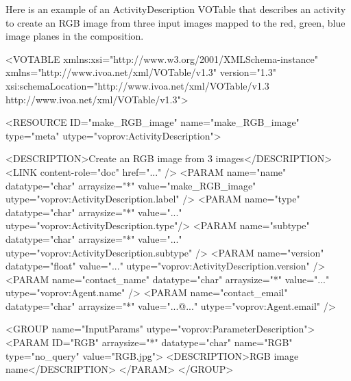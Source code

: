 Here is an example of an ActivityDescription VOTable that describes an activity to create an RGB image from three input images mapped to the red, green, blue image planes in the composition. 

\begin{verbnobox}[\scriptsize]

<VOTABLE xmlns:xsi="http://www.w3.org/2001/XMLSchema-instance" 
    xmlns="http://www.ivoa.net/xml/VOTable/v1.3" version="1.3" 
    xsi:schemaLocation="http://www.ivoa.net/xml/VOTable/v1.3 
    http://www.ivoa.net/xml/VOTable/v1.3">
    
  <RESOURCE ID="make_RGB_image" name="make_RGB_image" 
      type="meta" utype="voprov:ActivityDescription">
      
    <DESCRIPTION>Create an RGB image from 3 images</DESCRIPTION>
    <LINK content-role="doc" href="..." />
    <PARAM name="name" datatype="char" arraysize="*" 
        value="make_RGB_image" utype="voprov:ActivityDescription.label" />
    <PARAM name="type" datatype="char" arraysize="*" 
        value="..." utype="voprov:ActivityDescription.type"/>
    <PARAM name="subtype" datatype="char" arraysize="*" 
        value="..." utype="voprov:ActivityDescription.subtype" />
    <PARAM name="version" datatype="float" 
        value="..." utype="voprov:ActivityDescription.version" />
    <PARAM name="contact_name" datatype="char" arraysize="*" 
        value="..." utype="voprov:Agent.name" />
    <PARAM name="contact_email" datatype="char" arraysize="*" 
        value="...@..." utype="voprov:Agent.email" />
        
    <GROUP name="InputParams" utype="voprov:ParameterDescription">
      <PARAM ID="RGB" arraysize="*" datatype="char" name="RGB" 
          type="no_query" value="RGB.jpg">
        <DESCRIPTION>RGB image name</DESCRIPTION>
      </PARAM>
    </GROUP>
		

\end{verbnobox}
